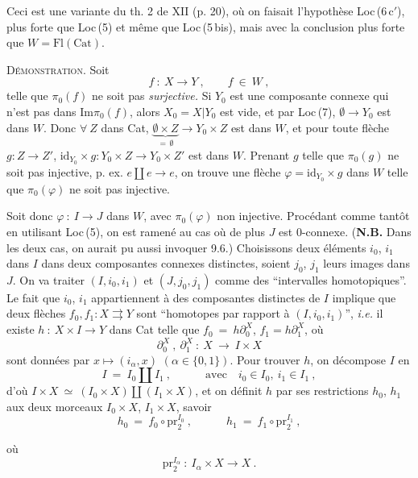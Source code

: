 \documentclass[11pt]{article}
\newcommand{\printedpage}[1]{\marginpar{\raggedright\footnotesize p.~#1}}
\newcommand{\msp}[1]{\marginpar{\raggedright\footnotesize [#1]}}
\newcommand{\Fl}{\mathrm{Fl}}
\newcommand{\Cat}{\mathrm{Cat}}
\newcommand{\id}{\mathrm{id}}
\newcommand{\pr}{\mathrm{pr}}
\begin{document}
Ceci est une variante du th. 2 de XII (p. 20), où on faisait l'hypothèse Loc\,(6\,c$'$), plus forte que Loc\,(5) et même que Loc\,(5\,bis), mais avec la conclusion plus forte que $W=\Fl(\Cat)$.

\textsc{Démonstration}. Soit
\[
f\ :\ X\longrightarrow Y\ ,\qquad f\ \in\ W\ ,
\]
telle que $\pi_0(f)$ ne soit pas \textit{surjective.} Si $Y_0$ est une composante connexe qui n'est pas dans $\mathrm{Im}\pi_0(f)$, alors $X_0=X|Y_0$ est vide, et par Loc\,(7), $\emptyset\longrightarrow Y_0$ est dans $W$. Donc $\forall\ Z$ dans Cat, %
$\underbrace{\emptyset\times Z}_{=\,\emptyset}\longrightarrow Y_0\times Z$ est dans $W$, et pour toute flèche $g : Z\longrightarrow Z'$, $\id_{Y_0}\times g : Y_0\times Z\longrightarrow Y_0\times Z'$ est dans $W$. Prenant $g$ telle que $\pi_0(g)$ ne soit pas injective, p. ex. $e\amalg e\longrightarrow e$, on trouve une flèche $\varphi=\id_{Y_0}\times g$ dans $W$ telle que $\pi_0(\varphi)$ ne soit pas injective.

\msp{page 127}

Soit donc $\varphi\ :\ I\longrightarrow J$ dans $W$, avec $\pi_0(\varphi)$ non injective. Procédant comme tantôt en utilisant Loc\,(5), on est ramené au cas où de plus $J$ est $0$-connexe. (\textbf{N.B.} Dans les deux cas, on aurait pu aussi invoquer 9.6.) Choisissons deux éléments $i_0$, $i_1$ dans $I$ dans deux composantes connexes distinctes, soient $j_0$, $j_1$ leurs images dans $J$. On va traiter $(I,i_0,i_1)$ et $(J,j_0,j_1)$ comme des “intervalles homotopiques”. Le fait que $i_0$, $i_1$ appartiennent à des composantes distinctes de $I$ implique que deux flèches $f_0,f_1 : X\rightrightarrows Y$ sont “homotopes par rapport à $(I,i_0,i_1)$”, \textit{i.e.} il existe $h\ :\ X\times I\longrightarrow Y$ dans Cat telle que $f_0\ =\ h\partial_0^X$, $f_1=h\partial_1^X$, où
\[
\partial_0^X\ ,\ \partial_1^X\ :\ X\ \longrightarrow\ I\times X
\]
sont données par $x\longmapsto(i_\alpha,x)$ $(\alpha\in\{0,1\})$. Pour trouver $h$, on décompose $I$ en
\[
I\ =\ I_0\amalg I_1\ ,\qquad\quad \text{avec}\quad i_0\in I_0,\ i_1\in I_1\ ,
\]
d'où $I\times X\ \simeq\ (I_0\times X)\amalg(I_1\times X)$, et on définit $h$ par ses restrictions $h_0$, $h_1$ aux deux morceaux $I_0\times X$, $I_1\times X$, savoir
\[
h_0\ =\ f_0\circ\mathrm{pr}_2^{I_0}\ ,\qquad\quad h_1\ =\ f_1\circ\mathrm{pr}_2^{I_1}\ ,
\]

\printedpage{69}
où
\[
\pr_2^{I_\alpha}\ :\ I_\alpha\times X \longrightarrow X\ .
\]
\end{document}
